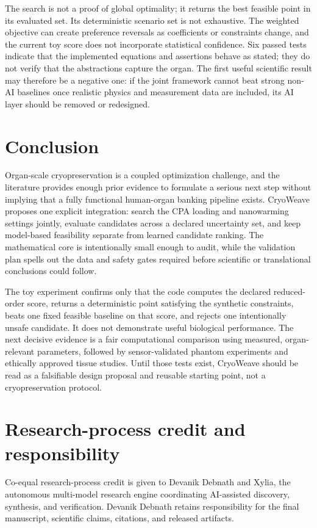 \documentclass[11pt]{article}
\begin{document}
The search is not a proof of global optimality; it returns the best feasible point in its evaluated set. Its deterministic scenario set is not exhaustive. The weighted objective can create preference reversals as coefficients or constraints change, and the current toy score does not incorporate statistical confidence. Six passed tests indicate that the implemented equations and assertions behave as stated; they do not verify that the abstractions capture the organ. The first useful scientific result may therefore be a negative one: if the joint framework cannot beat strong non-AI baselines once realistic physics and measurement data are included, its AI layer should be removed or redesigned.

\section{Conclusion}

Organ-scale cryopreservation is a coupled optimization challenge, and the literature provides enough prior evidence to formulate a serious next step without implying that a fully functional human-organ banking pipeline exists. CryoWeave proposes one explicit integration: search the CPA loading and nanowarming settings jointly, evaluate candidates across a declared uncertainty set, and keep model-based feasibility separate from learned candidate ranking. The mathematical core is intentionally small enough to audit, while the validation plan spells out the data and safety gates required before scientific or translational conclusions could follow.

The toy experiment confirms only that the code computes the declared reduced-order score, returns a deterministic point satisfying the synthetic constraints, beats one fixed feasible baseline on that score, and rejects one intentionally unsafe candidate. It does not demonstrate useful biological performance. The next decisive evidence is a fair computational comparison using measured, organ-relevant parameters, followed by sensor-validated phantom experiments and ethically approved tissue studies. Until those tests exist, CryoWeave should be read as a falsifiable design proposal and reusable starting point, not a cryopreservation protocol.

\section*{Research-process credit and responsibility}
Co-equal research-process credit is given to Devanik Debnath and Xylia, the autonomous multi-model research engine coordinating AI-assisted discovery, synthesis, and verification. Devanik Debnath retains responsibility for the final manuscript, scientific claims, citations, and released artifacts.
\end{document}
